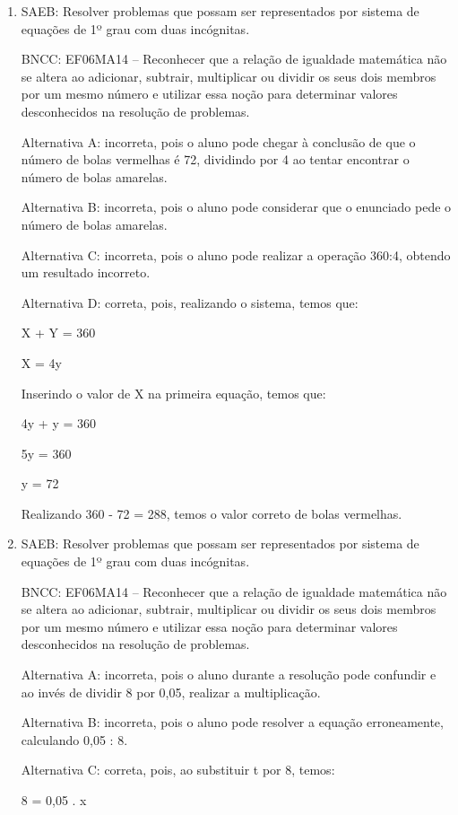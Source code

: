 	\begin{enumerate}

		\item SAEB: Resolver problemas que possam ser representados por sistema de
equações de 1º grau com duas incógnitas.

BNCC: EF06MA14 -- Reconhecer que a relação de igualdade matemática não
se altera ao adicionar, subtrair, multiplicar ou dividir os seus dois
membros por um mesmo número e utilizar essa noção para determinar
valores desconhecidos na resolução de problemas.

Alternativa A: incorreta, pois o aluno pode chegar à conclusão de que o
número de bolas vermelhas é 72, dividindo por 4 ao tentar encontrar o
número de bolas amarelas.

Alternativa B: incorreta, pois o aluno pode considerar que o enunciado
pede o número de bolas amarelas.

Alternativa C: incorreta, pois o aluno pode realizar a operação 360:4,
obtendo um resultado incorreto.

Alternativa D: correta, pois, realizando o sistema, temos que:

X + Y = 360

X = 4y

Inserindo o valor de X na primeira equação, temos que:

4y + y = 360

5y = 360

y = 72

Realizando 360 - 72 = 288, temos o valor correto de bolas vermelhas.

		\item SAEB: Resolver problemas que possam ser representados por sistema de
equações de 1º grau com duas incógnitas.

BNCC: EF06MA14 -- Reconhecer que a relação de igualdade matemática não
se altera ao adicionar, subtrair, multiplicar ou dividir os seus dois
membros por um mesmo número e utilizar essa noção para determinar
valores desconhecidos na resolução de problemas.

Alternativa A: incorreta, pois o aluno durante a resolução pode
confundir e ao invés de dividir 8 por 0,05, realizar a multiplicação.

Alternativa B: incorreta, pois o aluno pode resolver a equação
erroneamente, calculando 0,05 : 8.

Alternativa C: correta, pois, ao substituir t por 8, temos:

8 = 0,05 . x


\end{enumerate}
